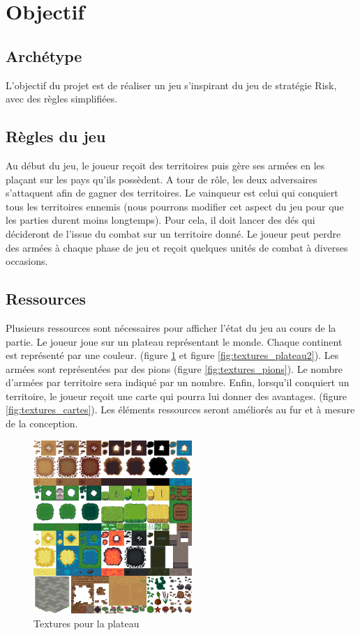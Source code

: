 \section{Objectif}

\subsection{Archétype}
    L'objectif du projet est de réaliser un jeu s'inspirant du jeu de stratégie Risk, avec des règles simplifiées.
    
\subsection{Règles du jeu}
    Au début du jeu, le joueur reçoit des territoires puis gère ses armées en les plaçant sur les pays qu'ils possèdent. A tour de rôle, les deux adversaires s'attaquent afin de gagner des territoires. Le vainqueur est celui qui conquiert tous les territoires ennemis (nous pourrons modifier cet aspect du jeu pour que les parties durent moins longtemps). Pour cela, il doit lancer des dés qui décideront de l'issue du combat sur un territoire donné. Le joueur peut perdre des armées à chaque phase de jeu et reçoit quelques unités de combat à diverses occasions. 

\subsection{Ressources}
    Plusieurs ressources sont nécessaires pour afficher l'état du jeu au cours de la partie. 
    Le joueur joue sur un plateau représentant le monde. Chaque continent est représenté par une couleur.  (figure \ref{fig:textures_plateau} et figure \ref{fig:textures_plateau2}).  Les armées sont représentées par des pions (figure \ref{fig:textures_pions}). Le nombre d'armées par territoire sera indiqué par un nombre. Enfin, lorsqu'il conquiert un territoire, le joueur reçoit une carte qui pourra lui donner des avantages. (figure \ref{fig:textures_cartes}). Les éléments ressources seront améliorés au fur et à mesure de la conception. 
    
    \begin{figure}[!htbp]
        \centering
        \includegraphics[width=6cm]{Images/terrain.png}
        \caption{Textures pour la plateau}
        \label{fig:textures_plateau}
    \end{figure}
    \newpage
    
